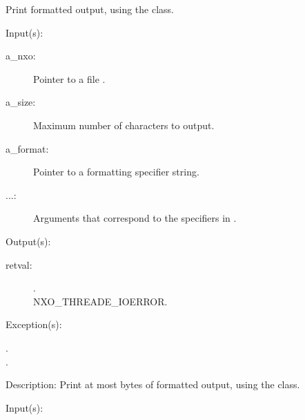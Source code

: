 \begin{capi}
\begin{capilist}
		Print formatted output, using the 
		class.
	\end{capilist}
\label{nxo_file_output_n}
	\begin{capilist}
	\item[Input(s): ]
		\begin{description}\item[]
		\item[a\_nxo: ]
			Pointer to a file .
		\item[a\_size: ]
			Maximum number of characters to output.
		\item[a\_format: ]
			Pointer to a formatting specifier string.
		\item[...: ]
			Arguments that correspond to the specifiers in
			.
		\end{description}
	\item[Output(s): ]
		\begin{description}\item[]
		\item[retval: ]
			\begin{description}\item[]
			\item[.]
			\item[
				{NXO_THREADE_IOERROR}.]
			\end{description}
		\end{description}
	\item[Exception(s): ]
		\begin{description}\item[]
		\item[.]
		\item[.]
		\end{description}
	\item[Description: ]
		Print at most  bytes of formatted output, using
		the  class.
	\end{capilist}
\label{nxo_file_truncate}
	\begin{capilist}
	\item[Input(s): ]

\end{capilist}
\end{capi}
